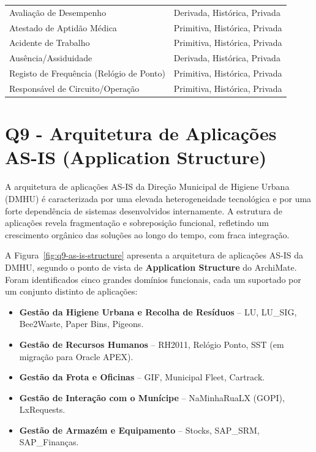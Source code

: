 \documentclass[12pt,a4paper,final]{article}
\begin{document}
\begin{longtable}{|p{6cm}|p{7cm}|}
        Avaliação de Desempenho                  & Derivada, Histórica, Privada    \\
        Atestado de Aptidão Médica               & Primitiva, Histórica, Privada   \\
        Acidente de Trabalho                     & Primitiva, Histórica, Privada   \\
        Ausência/Assiduidade                     & Derivada, Histórica, Privada    \\
        Registo de Frequência (Relógio de Ponto) & Primitiva, Histórica, Privada   \\
        Responsável de Circuito/Operação         & Primitiva, Histórica, Privada   \\
    \end{longtable}

    \section*{Q9 - Arquitetura de Aplicações AS-IS (Application Structure)}

    A arquitetura de aplicações AS-IS da Direção Municipal de Higiene Urbana (DMHU) é caracterizada por uma elevada heterogeneidade tecnológica e por uma forte dependência de sistemas desenvolvidos internamente.
    A estrutura de aplicações revela fragmentação e sobreposição funcional, refletindo um crescimento orgânico das soluções ao longo do tempo, com fraca integração.

    A Figura~\ref{fig:q9-as-is-structure} apresenta a arquitetura de aplicações AS-IS da DMHU, segundo o ponto de vista de \textbf{Application Structure} do ArchiMate.
    Foram identificados cinco grandes domínios funcionais, cada um suportado por um conjunto distinto de aplicações:

    \begin{itemize}
        \item \textbf{Gestão da Higiene Urbana e Recolha de Resíduos} – LU, LU\_SIG, Bee2Waste, Paper Bins, Pigeons.
        \item \textbf{Gestão de Recursos Humanos} – RH2011, Relógio Ponto, SST (em migração para Oracle APEX).
        \item \textbf{Gestão da Frota e Oficinas} – GIF, Municipal Fleet, Cartrack.
        \item \textbf{Gestão de Interação com o Munícipe} – NaMinhaRuaLX (GOPI), LxRequests.
        \item \textbf{Gestão de Armazém e Equipamento} – Stocks, SAP\_SRM, SAP\_Finanças.
    \end{itemize}
\end{document}
